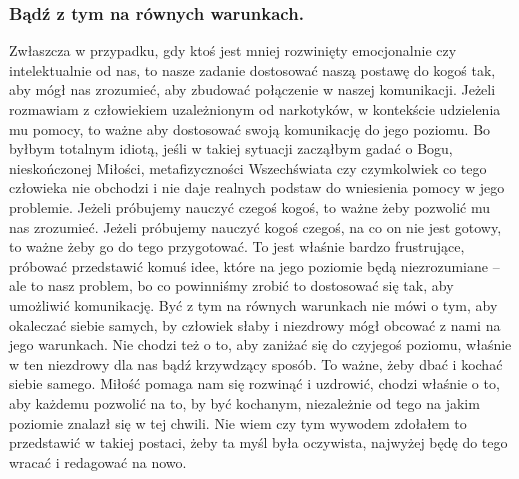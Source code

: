\documentclass[../dotknieci-miloscia.tex]{subfiles}
\begin{document}
\subsubsection{Bądź z tym na równych warunkach.}
Zwłaszcza w przypadku, gdy ktoś jest mniej rozwinięty emocjonalnie czy intelektualnie od nas, 
to nasze zadanie dostosować naszą postawę do kogoś tak, 
aby mógł nas zrozumieć, aby zbudować połączenie w naszej komunikacji. 
Jeżeli rozmawiam z człowiekiem uzależnionym od narkotyków, 
w kontekście udzielenia mu pomocy, 
to ważne aby dostosować swoją komunikację do jego poziomu. 
Bo byłbym totalnym idiotą, jeśli w takiej sytuacji zacząłbym gadać o Bogu, 
nieskończonej Miłości, metafizyczności Wszechświata 
czy czymkolwiek co tego człowieka nie obchodzi 
i nie daje realnych podstaw do wniesienia pomocy w jego problemie. 
Jeżeli próbujemy nauczyć czegoś kogoś, to ważne żeby pozwolić mu nas zrozumieć. 
Jeżeli próbujemy nauczyć kogoś czegoś, na co on nie jest gotowy, to ważne żeby go do tego przygotować. 
To jest właśnie bardzo frustrujące, 
próbować przedstawić komuś idee, które na jego poziomie będą niezrozumiane 
-- ale to nasz problem, bo co powinniśmy zrobić to dostosować się tak, aby umożliwić komunikację. 
Być z tym na równych warunkach nie mówi o tym, aby okaleczać siebie samych, 
by człowiek słaby i niezdrowy mógł obcować z nami na jego warunkach. 
Nie chodzi też o to, aby zaniżać się do czyjegoś poziomu, 
właśnie w ten niezdrowy dla nas bądź krzywdzący sposób. 
To ważne, żeby dbać i kochać siebie samego. 
Miłość pomaga nam się rozwinąć i uzdrowić, chodzi właśnie o to, 
aby każdemu pozwolić na to, by być kochanym, 
niezależnie od tego na jakim poziomie znalazł się w tej chwili. 
Nie wiem czy tym wywodem zdołałem to przedstawić w takiej postaci, 
żeby ta myśl była oczywista, najwyżej będę do tego wracać i redagować na nowo.
\end{document}
